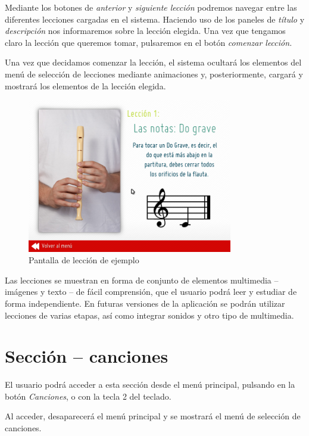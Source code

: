 Mediante los botones de \textit{anterior} y \textit{siguiente lección} podremos
navegar entre las diferentes lecciones cargadas en el sistema. Haciendo uso de
los paneles de \textit{título} y \textit{descripción} nos informaremos sobre la
lección elegida. Una vez que tengamos claro la lección que queremos tomar,
pulsaremos en el botón \textit{comenzar lección.}

Una vez que decidamos comenzar la lección, el sistema ocultará los elementos del
menú de selección de lecciones mediante animaciones y, posteriormente, cargará y
mostrará los elementos de la lección elegida.

\begin{figure}[h!]
  \centering
  \includegraphics[width=0.8\textwidth]{apendice_manual_usuario/imagen_seccionLecciones2}
  \caption{Pantalla de lección de ejemplo}
\end{figure}

Las lecciones se muestran en forma de conjunto de elementos multimedia --
imágenes y texto -- de fácil comprensión, que el usuario podrá leer y estudiar
de forma independiente. En futuras versiones de la aplicación se podrán utilizar
lecciones de varias etapas, así como integrar sonidos y otro tipo de multimedia.

\section{Sección -- canciones}

El usuario podrá acceder a esta sección desde el menú principal, pulsando en la
botón \textit{Canciones}, o con la tecla 2 del teclado.

Al acceder, desaparecerá el menú principal y se mostrará el menú de selección de
canciones.

